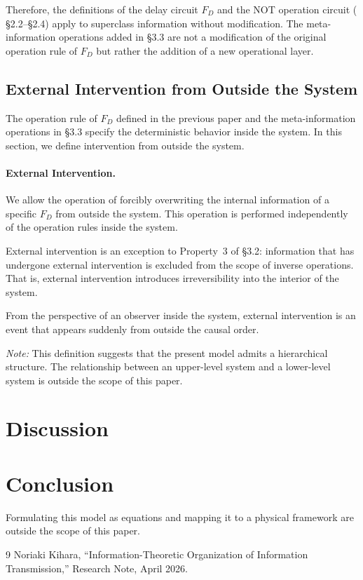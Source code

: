 \documentclass[12pt,a4paper]{article}
\begin{document}
Therefore, the definitions of the delay circuit $F_D$ and the NOT operation circuit
(\cite{kihara2026} \S2.2--\S2.4) apply to superclass information without modification. The
meta-information operations added in \S3.3 are not a modification of the original operation rule
of $F_D$ but rather the addition of a new operational layer.

\subsection{External Intervention from Outside the System}

The operation rule of $F_D$ defined in the previous paper \cite{kihara2026} and the
meta-information operations in \S3.3 specify the deterministic behavior inside the system. In this
section, we define intervention from outside the system.

\paragraph{External Intervention.}
We allow the operation of forcibly overwriting the internal information of a specific $F_D$ from
outside the system. This operation is performed independently of the operation rules inside the
system.

External intervention is an exception to Property~3 of \S3.2: information that has undergone
external intervention is excluded from the scope of inverse operations. That is, external
intervention introduces irreversibility into the interior of the system.

From the perspective of an observer inside the system, external intervention is an event that
appears suddenly from outside the causal order.

\textit{Note:} This definition suggests that the present model admits a hierarchical structure.
The relationship between an upper-level system and a lower-level system is outside the scope of
this paper.

\section{Discussion}

\section{Conclusion}

Formulating this model as equations and mapping it to a physical framework are outside the scope
of this paper.

\begin{thebibliography}{9}
  Noriaki Kihara,
  ``Information-Theoretic Organization of Information Transmission,''
  Research Note, April 2026.
\end{thebibliography}
\end{document}
